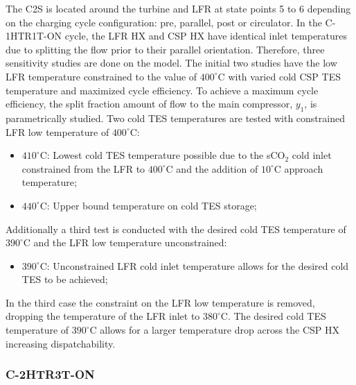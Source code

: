 \begin{paracol}{2}
\linenumbers
\switchcolumn

The C2S is located around the turbine and LFR at state points 5 to 6 depending on the charging cycle configuration: pre, parallel, post or circulator. In the C-1HTR1T-ON cycle, the LFR HX and CSP HX have identical inlet temperatures due to splitting the flow prior to their parallel orientation. Therefore, three sensitivity studies are done on the model. The initial two studies have the low LFR temperature constrained to the value of $400^{\circ}$C with varied cold CSP TES temperature and maximized cycle efficiency. To achieve a maximum cycle efficiency, the split fraction amount of flow to the main compressor, $y_{1}$, is parametrically studied.
Two cold TES temperatures are tested with constrained LFR low temperature of $400^{\circ}$C: 
\begin{itemize}
    \item	$410^{\circ}$C: Lowest cold TES temperature possible due to the sCO$_2$ cold inlet constrained from the LFR to $400^{\circ}$C and the addition of $10^{\circ}$C approach temperature;
    \item	$440^{\circ}$C: Upper bound temperature on cold TES storage;
\end{itemize}

Additionally a third test is conducted with the desired cold TES temperature of $390^{\circ}$C and the LFR low temperature unconstrained:

\begin{itemize}
    \item	$390^{\circ}$C: Unconstrained LFR cold inlet temperature allows for the desired cold TES to be achieved;
\end{itemize}

In the third case the constraint on the LFR low temperature is removed, dropping the temperature of the LFR inlet to $380^{\circ}$C. The desired cold TES temperature of $390^{\circ}$C allows for a larger temperature drop across the CSP HX increasing dispatchability.


\subsubsection{C-2HTR3T-ON} 


\end{paracol}
